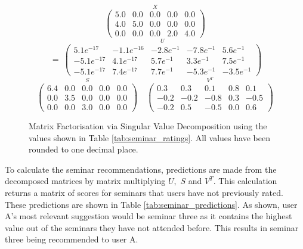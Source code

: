 \documentclass{l4proj}
\begin{document}
\begin{figure}[htb]
    \[
    \stackrel{\mbox{$X$}}{
        \begin{pmatrix}
            5.0 & 0.0 & 0.0 & 0.0 & 0.0 \\
            4.0 & 5.0 & 0.0 & 0.0 & 0.0 \\
            0.0 & 0.0 & 0.0 & 2.0 & 4.0
        \end{pmatrix}
    }
    \]
    \[
    ~
    =
    ~
    \stackrel{\mbox{$U$}}{
        \begin{pmatrix}
            5.1e^{-17} & -1.1e^{-16} & -2.8e^{-1} & -7.8e^{-1} & 5.6e^{-1} \\
            -5.1e^{-17} & 4.1e^{-17} & 5.7e^{-1} & 3.3e^{-1} & 7.5e^{-1}  \\
            -5.1e^{-17} & 7.4e^{-17} & 7.7e^{-1} & -5.3e^{-1} & -3.5e^{-1}
        \end{pmatrix}
    }
    \]
    \[
    \stackrel{\mbox{$S$}}{
        \begin{pmatrix}
            6.4 & 0.0 & 0.0 & 0.0 & 0.0 \\
            0.0 & 3.5 & 0.0 & 0.0 & 0.0 \\
            0.0 & 0.0 & 3.0 & 0.0 & 0.0
        \end{pmatrix}
    }
    \quad
    \stackrel{\mbox{$V^T$}}{
        \begin{pmatrix}
            0.3 & 0.3 & 0.1 & 0.8 & 0.1 \\
            -0.2 & -0.2 & -0.8 & 0.3 & -0.5 \\
            -0.2 & 0.5 & -0.5 & 0.0 & 0.6
        \end{pmatrix}
    }
    \]
    \caption{Matrix Factorisation via Singular Value Decomposition using the values shown in Table \ref{tab:seminar_ratings}. All values have been rounded to one decimal place.}
    \label{fig:svd_example} 
\end{figure}

To calculate the seminar recommendations, predictions are made from the decomposed matrices by matrix multiplying $U,$ $S$ and $V^T.$ This calculation returns a matrix of scores for seminars that users have not previously rated. These predictions are shown in Table \ref{tab:seminar_predictions}. As shown, user A's most relevant suggestion would be seminar three as it contains the highest value out of the seminars they have not attended before. This results in seminar three being recommended to user A.
\end{document}
